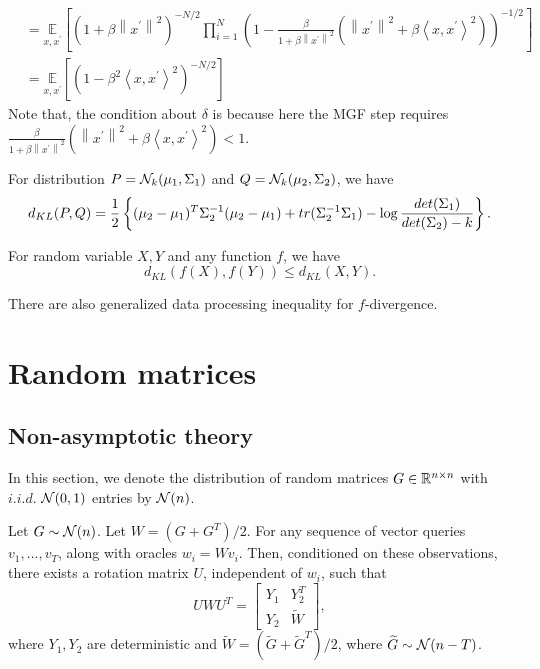 {$$\begin{aligned}
& =\underset{x, x^{\prime}}{\mathbb{E}}\left[\left(1+\beta\left\|x^{\prime}\right\|^2\right)^{-N / 2} \prod_{i=1}^N\left(1-\frac{\beta}{1+\beta\left\|x^{\prime}\right\|^2}\left(\left\|x^{\prime}\right\|^2+\beta\left\langle x, x^{\prime}\right\rangle^2\right)\right)^{-1 / 2}\right] \\
& =\underset{x, x^{\prime}}{\mathbb{E}}\left[\left(1-\beta^2\left\langle x, x^{\prime}\right\rangle^2\right)^{-N / 2}\right]
\end{aligned}
$$
Note that, the condition about $\delta$ is because here the MGF step requires
$
\frac{\beta}{1+\beta\left\|x^{\prime}\right\|^2}\left(\left\|x^{\prime}\right\|^2+\beta\left\langle x, x^{\prime}\right\rangle^2\right)<1
$.
}

\begin{thm}
\label{gauss_kl}
For distribution $P=\mathcal{N}_k(\mu_1,\Sigma_1)$ and $Q=\mathcal{N}_k(\mu_2,\Sigma_2)$, we have
\[
d_{KL}(P,Q)=\frac{1}{2}\left\{
(\mu_2-\mu_1)^T\Sigma_2^{-1}(\mu_2-\mu_1)
+ tr(\Sigma_2^{-1}\Sigma_1) - \log\frac{det(\Sigma_1)}{det(\Sigma_2)-k}
\right\}.
\]
\end{thm}
\pfsk{\ref{gauss_kl}}{}

\begin{thm}
\label{data_process}
For random variable $X,Y$ and any function $f$, we have
\[
d_{KL}(f(X),f(Y))\le d_{KL}(X,Y).
\]
\end{thm}
\pfsk{\ref{data_process}}{}
\begin{rmk}
    There are also generalized data processing inequality for $f$-divergence.
\end{rmk}

\section{Random matrices}

\subsection{Non-asymptotic theory}
In this section, we denote the distribution of random matrices $G\in\mathbb{R}^{n\times n}$ with $i.i.d.$ $\mathcal{N}(0,1)$ entries by $\mathcal{N}(n)$.
\begin{thm}
\label{block_conditional} 
Let $G\sim\mathcal{N}(n)$. Let $W=(G+G^T)/2$. For any sequence of vector queries $v_1,...,v_T$, along with oracles $w_i=Wv_i$. Then, conditioned on these observations, there exists a rotation matrix $U$, independent of $w_i$, such that
\[
UWU^T=\begin{bmatrix}
    Y_1 & Y_2^T \\
    Y_2 & \widetilde{W}
\end{bmatrix},
\]
where $Y_1,Y_2$ are deterministic and $\widetilde{W}=(\widetilde{G}+\widetilde{G}^T)/2$, where $\widetilde{G}\sim\mathcal{N}(n-T)$.
\end{thm}
\pfsk{\ref{block_conditional}}{

}

